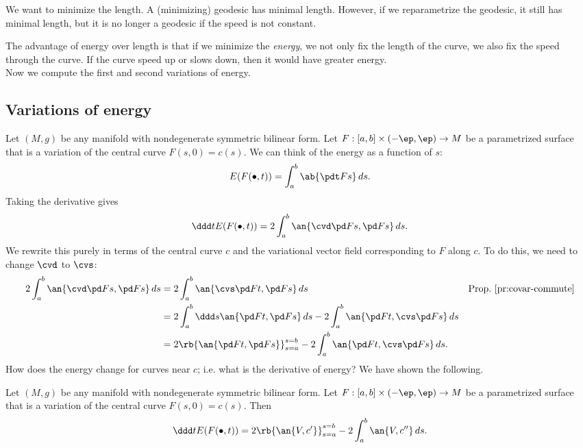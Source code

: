 We want to minimize the length. A (minimizing) geodesic has minimal length. However, if we reparametrize the geodesic, it still has minimal length, but it is no longer a geodesic if the speed is not constant.

The advantage of energy over length is that if we minimize the {\it energy}, we not only fix the length of the curve, we also fix the speed through the curve. If the curve speed up or slows down, then it would have greater energy.\\

\vskip0.15in
Now we compute the first and second variations of energy.

\subsection{Variations of energy}
Let $(M,g)$ be any manifold with nondegenerate symmetric bilinear form. Let $F:[a,b]\times (-\ep,\ep)\to M$ be a parametrized surface that is a variation of the central curve $F(s,0)=c(s)$. We can think of the energy as a function of $s$: 
\[
 E(F(\bullet, t))=\int_a^b \ab{{\pdt Fs}}\,ds.
\] 
Taking the derivative gives
\[
\ddd tE(F(\bullet, t))=2\int_a^b \an{\cvd \pd Fs,\pd Fs} \,ds.
\]
We rewrite this purely in terms of the central curve $c$ and the variational vector field corresponding to $F$ along $c$. To do this, we need to change $\cvd$ to $\cvs$:
\begin{align*}
2\int_a^b\an{\cvd \pd Fs,\pd Fs}\,ds&=2\int_a^b \an{\cvs \pd Ft, \pd Fs}\,ds&\text{Prop.~\ref{pr:covar-commute}}\\
&=2\int_a^b \ddd s\an{\pd Ft, \pd Fs}\,ds -2\int_a^b \an{\pd Ft, \cvs \pd Fs}\,ds\\
&=2\rb{\an{\pd Ft,\pd Fs}}_{s=a}^{s=b} - 2\int_a^b \an{\pd Ft, \cvs \pd Fs}\,ds.
\end{align*}
How does the energy change for curves near $c$; i.e. what is the derivative of energy? We have shown the following.
\begin{pr}
Let $(M,g)$ be any manifold with nondegenerate symmetric bilinear form. Let $F:[a,b]\times (-\ep,\ep)\to M$ be a parametrized surface that is a variation of the central curve $F(s,0)=c(s)$. Then
\[
\ddd t E(F(\bullet, t)) = 2\rb{\an{V,c'}}_{s=a}^{s=b} - 2\int_a^b \an{V,c''}\,ds.
\]
\end{pr}
